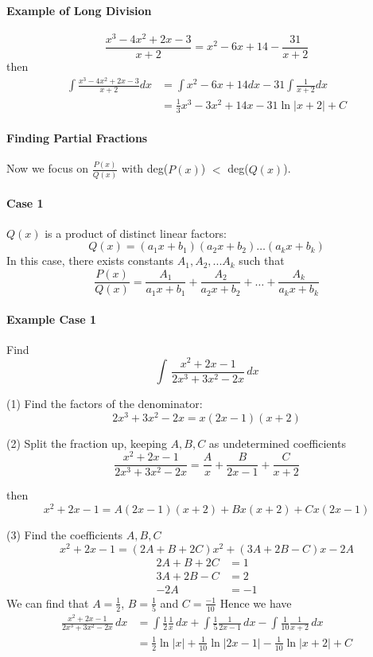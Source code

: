 \documentclass[12pt]{article}
\begin{document}
\paragraph{Example of Long Division} 
\[
    \frac{x^3 - 4x^2 + 2x - 3}{x + 2} = x^2 - 6x + 14 - \frac{31}{x + 2} 
\]
then
\begin{align*} 
    \int \frac{x^3 - 4x^2 + 2x - 3}{x + 2} dx &= \int x^2 - 6x + 14 dx - 31\int \frac{1}{x + 2} dx \\
    &= \frac{1}{3} x^3 - 3x^2 + 14x - 31 \ln |x + 2| + C
\end{align*}

\paragraph{Finding Partial Fractions}
Now we focus on $\frac{P(x)}{Q(x)}$ with deg($P(x)$) $<$ deg($Q(x)$).

\paragraph{Case 1} $Q(x)$ is a product of distinct linear factors:
\[
    Q(x) = (a_1x + b_1)(a_2x + b_2)\dots (a_kx + b_k)
\]
In this case, there exists constants $A_1, A_2, ... A_k$ such that
\[
    \frac{P(x)}{Q(x)} = \frac{A_1}{a_1x + b_1} + \frac{A_2}{a_2x + b_2} + \dots + \frac{A_k}{a_kx + b_k} 
\]

\paragraph{Example Case 1} Find
\[
    \int\,\frac{x^2 + 2x - 1}{2x^3 + 3x^2 - 2x}\, dx 
\]

(1) Find the factors of the denominator:
\[
    2x^3 + 3x^2 - 2x = x(2x - 1)(x + 2)
\]

(2) Split the fraction up, keeping $A, B, C$ as undetermined coefficients
\[
    \frac{x^2 + 2x - 1}{2x^3 + 3x^2 - 2x} = \frac{A}{x} + \frac{B}{2x - 1} + \frac{C}{x + 2}
\]

then 
\[
    x^2 + 2x - 1 = A(2x - 1)(x + 2) + Bx(x + 2) + Cx(2x - 1)
\]

(3) Find the coefficients $A, B, C$
\[
    x^2 + 2x - 1 = (2A + B + 2C)x^2 + (3A + 2B - C)x - 2A
\]
\begin{align*} 
     2A + B + 2C &= 1 \\
     3A + 2B - C &= 2 \\
     - 2A &= - 1
\end{align*}
We can find that $A = \frac{1}{2}$, $B = \frac{1}{5}$ and $C = \frac{-1}{10}$
Hence we have
\begin{align*} 
    \frac{x^2 + 2x - 1}{2x^3 + 3x^2 - 2x} \, dx &= \int \frac{1}{2} \frac{1}{x} \, dx + \int \frac{1}{5} \frac{1}{2x - 1} \, dx - \int \frac{1}{10} \frac{1}{x + 2} \, dx \\
    &= \frac{1}{2} \ln |x| + \frac{1}{10} \ln |2x - 1| - \frac{1}{10} \ln|x + 2| + C
\end{align*}
\end{document}
